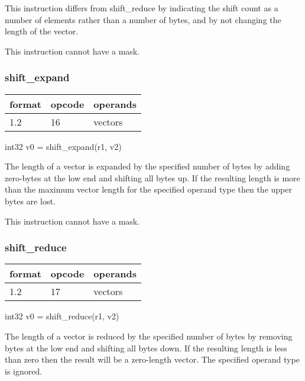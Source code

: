 \documentclass[forwardcom.tex]{subfiles}
\begin{document}
This instruction differs from shift\_reduce by indicating the shift count as a number of elements rather than a number of bytes, and by not changing the length of the vector.
\vspace{2mm}

This instruction cannot have a mask.


\subsubsection{shift\_expand}
\label{table:shiftExpandInstruction}
\begin{tabular}{|p{12mm}|p{12mm}|p{110mm}|}
\hline
\bfseries format & \bfseries opcode & \bfseries operands \\ \hline
1.2 & 16 & vectors \\ \hline
\end{tabular}
\vspace{2mm}

int32 v0 = shift\_expand(r1, v2)
\vspace{2mm}

The length of a vector is expanded by the specified number of bytes by adding zero-bytes at the low end and shifting all bytes up. If the resulting length is more than the maximum vector length for the specified operand type then the upper bytes are lost.
\vspace{2mm}

This instruction cannot have a mask.

\subsubsection{shift\_reduce}
\label{table:shiftReduceInstruction}
\begin{tabular}{|p{12mm}|p{12mm}|p{110mm}|}
\hline
\bfseries format & \bfseries opcode & \bfseries operands \\ \hline
1.2 & 17 & vectors \\ \hline
\end{tabular}
\vspace{2mm}

int32 v0 = shift\_reduce(r1, v2)
\vspace{2mm}

The length of a vector is reduced by the specified number of bytes by removing bytes at the low end and shifting all bytes down. If the resulting length is less than zero then the result will be a zero-length vector. The specified operand type is ignored.
\end{document}
